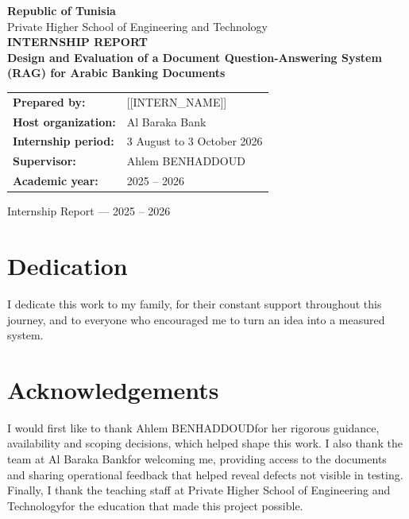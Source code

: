 \documentclass[a4paper,12pt,openany]{report}
\newcommand{\StudentName}{[[INTERN_NAME]]}
\newcommand{\SchoolName}{Private Higher School of Engineering and Technology}
\newcommand{\HostOrganization}{Al Baraka Bank}
\newcommand{\SupervisorName}{Ahlem BENHADDOUD}
\newcommand{\InternshipPeriod}{3 August to 3 October 2026}
\newcommand{\AcademicYear}{2025 -- 2026}
\newcommand{\InternshipTopic}{Design and Evaluation of a Document Question-Answering
System (RAG) for Arabic Banking Documents}
\begin{document}
\begin{titlepage}
\centering
\vspace*{0.6cm}
{\large\textbf{Republic of Tunisia}}\\[0.2cm]
{\normalsize \SchoolName}\\[1.2cm]

{\Large\bfseries INTERNSHIP REPORT}\\[0.7cm]
{\large\bfseries \InternshipTopic}\\[1.3cm]

\begin{tabular}{>{\bfseries}p{4.2cm}p{9.4cm}}
Prepared by: & \StudentName \\[0.2cm]
Host organization: & \HostOrganization \\[0.2cm]
Internship period: & \InternshipPeriod \\[0.2cm]
Supervisor: & \SupervisorName \\[0.2cm]
Academic year: & \AcademicYear \\
\end{tabular}

\vfill
{\small Internship Report — \AcademicYear}
\end{titlepage}


\chapter*{Dedication}
I dedicate this work to my family, for their constant support throughout this journey, and to
everyone who encouraged me to turn an idea into a measured system.

\clearpage
\chapter*{Acknowledgements}
I would first like to thank \SupervisorName for her rigorous guidance, availability and scoping
decisions, which helped shape this work. I also thank the team at \HostOrganization for welcoming
me, providing access to the documents and sharing operational feedback that helped reveal defects
not visible in testing. Finally, I thank the teaching staff at \SchoolName for the education that
made this project possible.

\clearpage
\tableofcontents
\clearpage
{}
\listoffigures
\clearpage
{}
\setcounter{page}{1}
\end{document}
